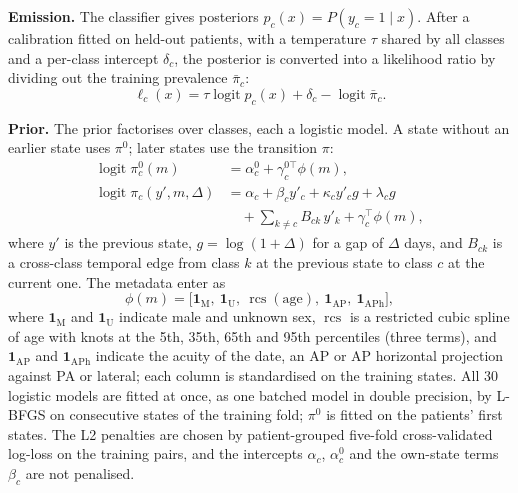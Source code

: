 \documentclass[conference]{IEEEtran}
\begin{document}
\textbf{Emission.} The classifier gives posteriors $p_c(x) = P(y_c{=}1 \mid x)$. After a calibration fitted on held-out patients, with a temperature $\tau$ shared by all classes and a per-class intercept $\delta_c$, the posterior is converted into a likelihood ratio by dividing out the training prevalence $\bar\pi_c$:
\begin{equation}
\ell_c(x) = \tau \operatorname{logit} p_c(x) + \delta_c - \operatorname{logit} \bar\pi_c .
\label{eq:emission}
\end{equation}

\textbf{Prior.} The prior factorises over classes, each a logistic model. A state without an earlier state uses $\pi^{0}$; later states use the transition $\pi$:
\begin{align}
\operatorname{logit} \pi^{0}_c(m) &= \alpha^{0}_c + \gamma^{0\top}_c \phi(m), \label{eq:init}\\
\operatorname{logit} \pi_c(y', m, \Delta) &= \alpha_c + \beta_c y'_c + \kappa_c y'_c g + \lambda_c g \nonumber\\
&\quad + \textstyle\sum_{k \neq c} B_{ck}\, y'_k + \gamma_c^{\top} \phi(m), \label{eq:trans}
\end{align}
where $y'$ is the previous state, $g = \log(1 + \Delta)$ for a gap of $\Delta$ days, and $B_{ck}$ is a cross-class temporal edge from class $k$ at the previous state to class $c$ at the current one. The metadata enter as
\begin{equation}
\phi(m) = \bigl[\mathbf{1}_{\mathrm{M}},\ \mathbf{1}_{\mathrm{U}},\ \operatorname{rcs}(\text{age}),\ \mathbf{1}_{\mathrm{AP}},\ \mathbf{1}_{\mathrm{APh}}\bigr],
\label{eq:phi}
\end{equation}
where $\mathbf{1}_{\mathrm{M}}$ and $\mathbf{1}_{\mathrm{U}}$ indicate male and unknown sex, $\operatorname{rcs}$ is a restricted cubic spline of age with knots at the 5th, 35th, 65th and 95th percentiles (three terms), and $\mathbf{1}_{\mathrm{AP}}$ and $\mathbf{1}_{\mathrm{APh}}$ indicate the acuity of the date, an AP or AP horizontal projection against PA or lateral; each column is standardised on the training states. All 30 logistic models are fitted at once, as one batched model in double precision, by L-BFGS on consecutive states of the training fold; $\pi^{0}$ is fitted on the patients' first states. The L2 penalties are chosen by patient-grouped five-fold cross-validated log-loss on the training pairs, and the intercepts $\alpha_c$, $\alpha^0_c$ and the own-state terms $\beta_c$ are not penalised.
\end{document}
